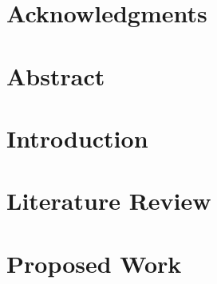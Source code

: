 \documentclass[a4paper, 11pt, oneside]{Dissertation}
\begin{document}
\sloppy
{}








\chapter*{Acknowledgments}
\label{ch:ack}


\chapter*{Abstract}
\label{ch:ack}




\pagestyle{fancy}
\tableofcontents
\listoffigures
\newpage

\mainmatter	  

\chapter{Introduction}
\label{ch:intro}


\chapter{Literature Review}
\label{ch:literature}


\chapter{Proposed Work}
\label{ch:new}


% 

% 

\newpage
{}
\small{{}}

\end{document}
